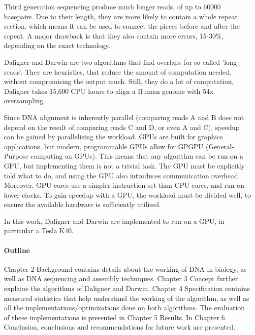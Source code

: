 \documentclass[../main/thesis.tex]{subfiles}
\begin{document}
Third generation sequencing produce much longer reads, of up to 60000 basepairs.
Due to their length, they are more likely to contain a whole repeat section, which means it can be used to connect the pieces before and after the repeat.
A major drawback is that they also contain more errors, 15-30\%, depending on the exact technology.

Daligner and Darwin are two algorithms that find overlaps for so-called 'long reads'.
They are heuristics, that reduce the amount of computation needed, without compromising the output much.
Still, they do a lot of computation, Daligner takes 15,600 CPU hours to align a Human genome with 54x oversampling.

Since DNA alignment is inherently parallel (comparing reads A and B does not depend on the result of comparing reads C and D, or even A and C), speedup can be gained by parallelising the workload.
GPUs are built for graphics applications, but modern, programmable GPUs allow for GPGPU (General-Purpose computing on GPUs).
This means that any algorithm can be run on a GPU, but implementing them is not a trivial task.
The GPU must be explicitly told what to do, and using the GPU also introduces communication overhead.
Moreover, GPU cores use a simpler instruction set than CPU cores, and run on lower clocks.
To gain speedup with a GPU, the workload must be divided well, to ensure the available hardware is sufficiently utilised.

In this work, Daligner and Darwin are implemented to run on a GPU, in particular a Tesla K40.

\paragraph{Outline}
Chapter 2 Background contains details about the working of DNA in biology, as well as DNA sequencing and assembly techniques.
Chapter 3 Concept further explains the algorithms of Daligner and Darwin.
Chapter 4 Specification contains measured statistics that help understand the working of the algorithm, as well as all the implementations/optimizations done on both algorithms.
The evaluation of these implementations is presented in Chapter 5 Results.
In Chapter 6 Conclusion, conclusions and recommendations for future work are presented.
\end{document}

